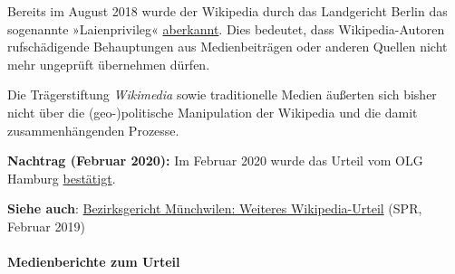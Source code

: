 Bereits im August 2018 wurde der Wikipedia durch das Landgericht Berlin
das sogenannte »Laienprivileg«
\href{https://www.heise.de/newsticker/meldung/Urteil-gegen-Wikipedia-Keine-rufschaedigende-Kritik-ohne-Recherche-4209610.html}{aberkannt}.
Dies bedeutet, dass Wikipedia-Autoren rufschädigende Behauptungen aus
Medienbeiträgen oder anderen Quellen nicht mehr ungeprüft übernehmen
dürfen.

Die Trägerstiftung \emph{Wikimedia} sowie traditionelle Medien äußerten
sich bisher nicht über die (geo-)politische Manipulation der Wikipedia
und die damit zusammen­hängenden Prozesse.

\textbf{Nachtrag (Februar 2020):} Im Februar 2020 wurde das Urteil vom
OLG Hamburg
\href{https://kanzleikompa.de/2020/02/18/olg-hamburg-deanonymisierung-von-autoren-politischer-beitraege-zulaessig/}{bestätigt}.

\textbf{Siehe auch}:
\href{https://swprs.org/weiteres-urteil-im-fall-wikipedia/}{Bezirksgericht
Münchwilen: Weiteres Wikipedia-Urteil} (SPR, Februar 2019)

\hypertarget{medienberichte-zum-urteil}{%
\paragraph{Medienberichte zum Urteil}\label{medienberichte-zum-urteil}}

